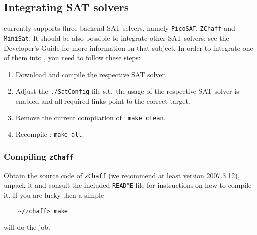 

\subsection{Integrating SAT solvers}

\pgsolver currently supports three backend SAT solvers, namely \texttt{PicoSAT},
\texttt{ZChaff} and \texttt{MiniSat}. It should be also possible to integrate
other SAT solvers; see the Developer's Guide for more information on that subject. In order to integrate one of them into \pgsolver, you need to follow these
steps:
\begin{enumerate}
\item Download and compile the respective SAT solver.
\item Adjust the \texttt{./SatConfig} file s.t.\ the usage of the respective
SAT solver is enabled and all required links point to the correct target.
\item Remove the current compilation of \pgsolver: \verb#make clean#.
\item Recompile \pgsolver: \verb#make all#.
\end{enumerate}


\subsubsection{Compiling \texttt{zChaff}}

Obtain the source code of \texttt{zChaff} (we recommend at least version 2007.3.12), unpack it and
consult the included \texttt{README} file for instructions on how to compile it. If you are lucky
then a simple
\begin{verbatim}
    ~/zchaff> make
\end{verbatim}
will do the job.


